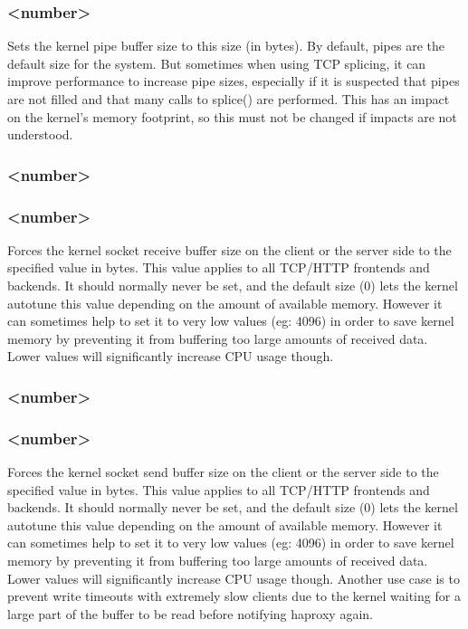 \subsubsection[tune.pipesize]{ <number>}

Sets the kernel pipe buffer size to this size (in bytes). By default, pipes
are the default size for the system. But sometimes when using TCP splicing,
it can improve performance to increase pipe sizes, especially if it is
suspected that pipes are not filled and that many calls to splice() are
performed. This has an impact on the kernel's memory footprint, so this must
not be changed if impacts are not understood.

\subsubsection[tune.rcvbuf.client]{ <number>}
\subsubsection[tune.rcvbuf.server]{ <number>}

Forces the kernel socket receive buffer size on the client or the server side
to the specified value in bytes. This value applies to all TCP/HTTP frontends
and backends. It should normally never be set, and the default size (0) lets
the kernel autotune this value depending on the amount of available memory.
However it can sometimes help to set it to very low values (eg: 4096) in
order to save kernel memory by preventing it from buffering too large amounts
of received data. Lower values will significantly increase CPU usage though.

\subsubsection[tune.sndbuf.client]{ <number>}
\subsubsection[tune.sndbuf.server]{ <number>}

Forces the kernel socket send buffer size on the client or the server side to
the specified value in bytes. This value applies to all TCP/HTTP frontends
and backends. It should normally never be set, and the default size (0) lets
the kernel autotune this value depending on the amount of available memory.
However it can sometimes help to set it to very low values (eg: 4096) in
order to save kernel memory by preventing it from buffering too large amounts
of received data. Lower values will significantly increase CPU usage though.
Another use case is to prevent write timeouts with extremely slow clients due
to the kernel waiting for a large part of the buffer to be read before
notifying haproxy again.


